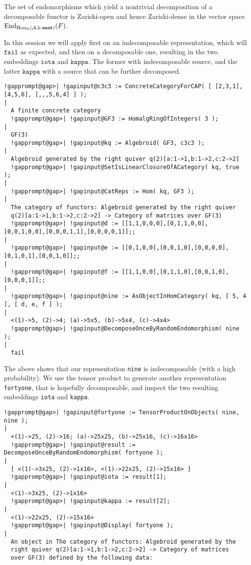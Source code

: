 \begin{remark}
The set of endomorphisms which yield a nontrivial decomposition of a decomposable functor is Zariski-open and hence Zariski-dense in
the vector space $\mathrm{End}_{\mathrm{Hom_{\Bbbk}}(\mathcal{A},\Bbbk\textnormal{-}\mathbf{mat})}(F)$.
\end{remark}

\begin{computation} In this \Gap{} session we will apply 
first on an indecomposable representation, which will $\mathtt{fail}$ as expected, and then on a decomposable one,
resulting in the two embeddings $\mathtt{iota}$ and $\mathtt{kappa}$. The former with indecomposable source,
and the latter $\mathtt{kappa}$ with a source that can be further decomposed.\\

\begin{Verbatim}[commandchars=!@|,fontsize=\small,frame=single,label=Example]
  !gapprompt@gap>| !gapinput@c3c3 := ConcreteCategoryForCAP( [ [2,3,1], [4,5,6], [,,,5,6,4] ] );
|
  A finite concrete category
  !gapprompt@gap>| !gapinput@GF3 := HomalgRingOfIntegers( 3 );
|
  GF(3)
  !gapprompt@gap>| !gapinput@kq := Algebroid( GF3, c3c3 );
|
  Algebroid generated by the right quiver q(2)[a:1->1,b:1->2,c:2->2]
  !gapprompt@gap>| !gapinput@SetIsLinearClosureOfACategory( kq, true );
|
  !gapprompt@gap>| !gapinput@CatReps := Hom( kq, GF3 );
|
  The category of functors: Algebroid generated by the right quiver
  q(2)[a:1->1,b:1->2,c:2->2] -> Category of matrices over GF(3)
  !gapprompt@gap>| !gapinput@d := [[1,1,0,0,0],[0,1,1,0,0],[0,0,1,0,0],[0,0,0,1,1],[0,0,0,0,1]];;
|
  !gapprompt@gap>| !gapinput@e := [[0,1,0,0],[0,0,1,0],[0,0,0,0],[0,1,0,1],[0,0,1,0]];;
|
  !gapprompt@gap>| !gapinput@f := [[1,1,0,0],[0,1,1,0],[0,0,1,0],[0,0,0,1]];;
|
  !gapprompt@gap>| !gapinput@nine := AsObjectInHomCategory( kq, [ 5, 4 ], [ d, e, f ] );
|
  <(1)->5, (2)->4; (a)->5x5, (b)->5x4, (c)->4x4>
  !gapprompt@gap>| !gapinput@DecomposeOnceByRandomEndomorphism( nine );
|
  fail
\end{Verbatim}
 The above shows that our representation \texttt{nine} is indecomposable (with a high probability). We use the tensor product to generate another
representation \texttt{fortyone}, that is hopefully decomposable, and inspect the two resulting embeddings \texttt{iota} and \texttt{kappa}. 
\begin{Verbatim}[commandchars=!@|,fontsize=\small,frame=single,label=Example]
  !gapprompt@gap>| !gapinput@fortyone := TensorProductOnObjects( nine, nine );
|
  <(1)->25, (2)->16; (a)->25x25, (b)->25x16, (c)->16x16>
  !gapprompt@gap>| !gapinput@result := DecomposeOnceByRandomEndomorphism( fortyone );
|
  [ <(1)->3x25, (2)->1x16>, <(1)->22x25, (2)->15x16> ]
  !gapprompt@gap>| !gapinput@iota := result[1];
|
  <(1)->3x25, (2)->1x16>
  !gapprompt@gap>| !gapinput@kappa := result[2];
|
  <(1)->22x25, (2)->15x16>
  !gapprompt@gap>| !gapinput@Display( fortyone );
|
  An object in The category of functors: Algebroid generated by the
  right quiver q(2)[a:1->1,b:1->2,c:2->2] -> Category of matrices
  over GF(3) defined by the following data:
  

\end{Verbatim}
\end{computation}
